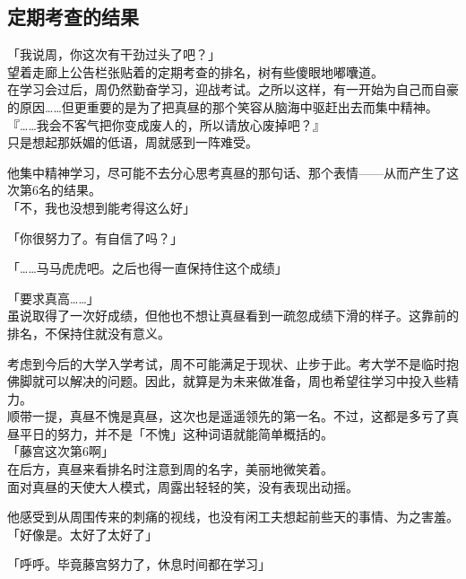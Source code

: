 \subsection{定期考查的结果}

「我说周，你这次有干劲过头了吧？」\\

望着走廊上公告栏张贴着的定期考查的排名，树有些傻眼地嘟囔道。\\

在学习会过后，周仍然勤奋学习，迎战考试。之所以这样，有一开始为自己而自豪的原因……但更重要的是为了把真昼的那个笑容从脑海中驱赶出去而集中精神。\\

『……我会不客气把你变成废人的，所以请放心废掉吧？』\\

只是想起那妖媚的低语，周就感到一阵难受。

他集中精神学习，尽可能不去分心思考真昼的那句话、那个表情——从而产生了这次第6名的结果。\\

「不，我也没想到能考得这么好」

「你很努力了。有自信了吗？」

「……马马虎虎吧。之后也得一直保持住这个成绩」

「要求真高……」\\

虽说取得了一次好成绩，但他也不想让真昼看到一疏忽成绩下滑的样子。这靠前的排名，不保持住就没有意义。

考虑到今后的大学入学考试，周不可能满足于现状、止步于此。考大学不是临时抱佛脚就可以解决的问题。因此，就算是为未来做准备，周也希望往学习中投入些精力。\\

顺带一提，真昼不愧是真昼，这次也是遥遥领先的第一名。不过，这都是多亏了真昼平日的努力，并不是「不愧」这种词语就能简单概括的。\\

「藤宫这次第6啊」\\

在后方，真昼来看排名时注意到周的名字，美丽地微笑着。\\

面对真昼的天使大人模式，周露出轻轻的笑，没有表现出动摇。

他感受到从周围传来的刺痛的视线，也没有闲工夫想起前些天的事情、为之害羞。\\

「好像是。太好了太好了」

「呼呼。毕竟藤宫努力了，休息时间都在学习」

